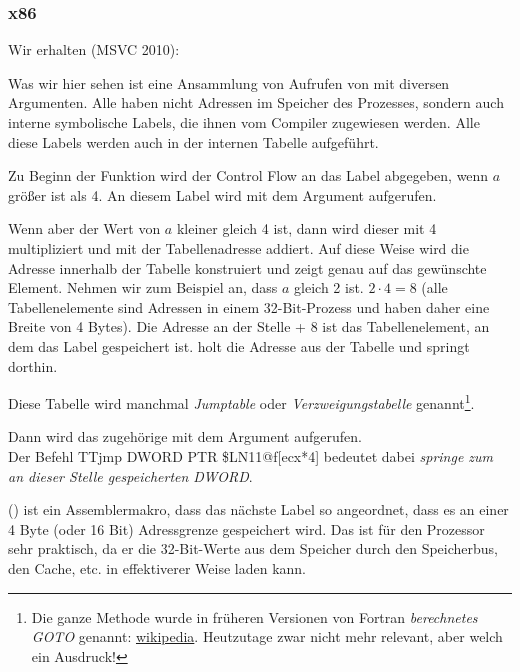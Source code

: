 \subsubsection{x86}


Wir erhalten (MSVC 2010):



Was wir hier sehen ist eine Ansammlung von Aufrufen von \printf mit diversen Argumenten.
Alle haben nicht Adressen im Speicher des Prozesses, sondern auch interne symbolische Labels, die ihnen vom Compiler
zugewiesen werden.
Alle diese Labels werden auch in der internen Tabelle  aufgeführt. 

Zu Beginn der Funktion wird der Control Flow an das Label  abgegeben, wenn $a$ größer ist als 4. An diesem
Label wird \printf mit dem Argument  aufgerufen.

Wenn aber der Wert von $a$ kleiner gleich 4 ist, dann wird dieser mit 4 multipliziert und mit der Tabellenadresse
 addiert. Auf diese Weise wird die Adresse innerhalb der Tabelle konstruiert und zeigt genau auf das
gewünschte Element. Nehmen wir zum Beispiel an, dass $a$ gleich 2 ist. $2\cdot 4=8$ (alle Tabellenelemente sind
Adressen in einem 32-Bit-Prozess und haben daher eine Breite von 4 Bytes).
Die Adresse an der Stelle  + 8 ist das Tabellenelement, an dem das Label  gespeichert ist.
\JMP holt die Adresse  aus der Tabelle und springt dorthin.

Diese Tabelle wird manchmal \emph{Jumptable} oder \emph{Verzweigungstabelle} genannt\footnote{Die ganze Methode wurde
in früheren Versionen von Fortran \emph{berechnetes GOTO} genannt:
\href{http://en.wikipedia.org/wiki/Branch_table}{wikipedia}.
Heutzutage zwar nicht mehr relevant, aber welch ein Ausdruck!}.

Dann wird das zugehörige \printf mit dem Argument  aufgerufen.\\
Der Befehl TT{jmp DWORD PTR \$LN11@f[ecx*4]} bedeutet dabei \emph{springe zum an dieser Stelle gespeicherten
DWORD}.

 () ist ein Assemblermakro, dass das nächste Label so angeordnet, dass es an einer 4 Byte
(oder 16 Bit) Adressgrenze gespeichert wird. Das ist für den Prozessor sehr praktisch, da er die 32-Bit-Werte aus dem
Speicher durch den Speicherbus, den Cache, etc. in effektiverer Weise laden kann.

